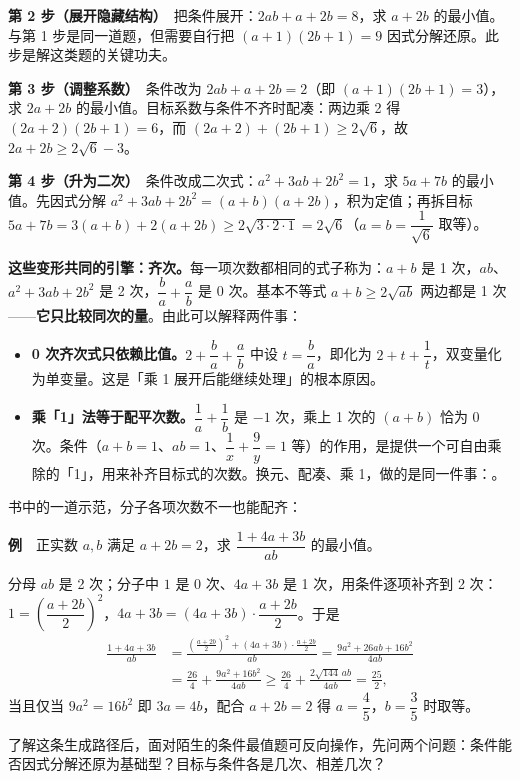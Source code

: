 \textbf{第 2 步（展开隐藏结构）}　把条件展开：$2ab+a+2b=8$，求 $a+2b$ 的最小值。与第 1 步是同一道题，但需要自行把 $(a+1)(2b+1)=9$ 因式分解还原。此步是解这类题的关键功夫。

\textbf{第 3 步（调整系数）}　条件改为 $2ab+a+2b=2$（即 $(a+1)(2b+1)=3$），求 $2a+2b$ 的最小值。目标系数与条件不齐时配凑：两边乘 2 得 $(2a+2)(2b+1)=6$，而 $(2a+2)+(2b+1)\ge 2\sqrt6$，故 $2a+2b\ge 2\sqrt6-3$。

\textbf{第 4 步（升为二次）}　条件改成二次式：$a^2+3ab+2b^2=1$，求 $5a+7b$ 的最小值。先因式分解 $a^2+3ab+2b^2=(a+b)(a+2b)$，积为定值；再拆目标 $5a+7b=3(a+b)+2(a+2b)\ge 2\sqrt{3\cdot2\cdot1}=2\sqrt6$（$a=b=\dfrac{1}{\sqrt6}$ 取等）。

\textbf{这些变形共同的引擎：齐次。}每一项次数都相同的式子称为：$a+b$ 是 1 次，$ab$、$a^2+3ab+2b^2$ 是 2 次，$\dfrac ba+\dfrac ab$ 是 0 次。基本不等式 $a+b\ge 2\sqrt{ab}$ 两边都是 1 次——\textbf{它只比较同次的量}。由此可以解释两件事：
\begin{itemize}
  \item \textbf{0 次齐次式只依赖比值。}$2+\dfrac ba+\dfrac ab$ 中设 $t=\dfrac ba$，即化为 $2+t+\dfrac1t$，双变量化为单变量。这是「乘 1 展开后能继续处理」的根本原因。
  \item \textbf{乘「1」法等于配平次数。}$\dfrac1a+\dfrac1b$ 是 $-1$ 次，乘上 1 次的 $(a+b)$ 恰为 0 次。条件（$a+b=1$、$ab=1$、$\dfrac1x+\dfrac9y=1$ 等）的作用，是提供一个可自由乘除的「1」，用来补齐目标式的次数。换元、配凑、乘 1，做的是同一件事：。
\end{itemize}

书中的一道示范，分子各项次数不一也能配齐：

\textbf{例}　正实数 $a,b$ 满足 $a+2b=2$，求 $\dfrac{1+4a+3b}{ab}$ 的最小值。

分母 $ab$ 是 2 次；分子中 $1$ 是 0 次、$4a+3b$ 是 1 次，用条件逐项补齐到 2 次：$1=\left(\dfrac{a+2b}{2}\right)^2$，$4a+3b=(4a+3b)\cdot\dfrac{a+2b}{2}$。于是
\begin{align*}
\frac{1+4a+3b}{ab}
  &=\frac{\left(\frac{a+2b}{2}\right)^2+(4a+3b)\cdot\frac{a+2b}{2}}{ab}
   =\frac{9a^2+26ab+16b^2}{4ab}\\
  &=\frac{26}{4}+\frac{9a^2+16b^2}{4ab}
   \ge\frac{26}{4}+\frac{2\sqrt{144}\,ab}{4ab}=\frac{25}{2},
\end{align*}
当且仅当 $9a^2=16b^2$ 即 $3a=4b$，配合 $a+2b=2$ 得 $a=\dfrac45$，$b=\dfrac35$ 时取等。

了解这条生成路径后，面对陌生的条件最值题可反向操作，先问两个问题：条件能否因式分解还原为基础型？目标与条件各是几次、相差几次？

